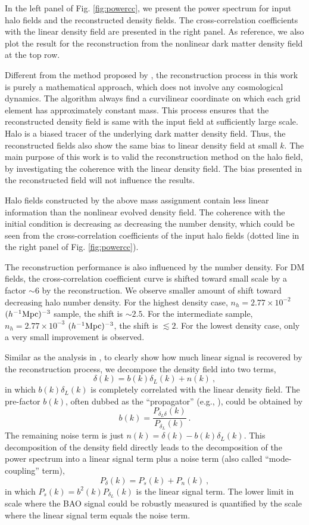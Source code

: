 \documentclass[iop]{emulateapj}
\newcommand{\be}{\begin{equation}}
\newcommand{\ee}{\end{equation}}
\newcommand{\mpch}{h^{-1} {\rm Mpc}}
\begin{document}
{In the left panel of Fig. \ref{fig:powercc}, we present the power spectrum for input halo fields and the reconstructed density fields.
The cross-correlation coefficients with the linear density field are presented in the right panel.
As reference, we also plot the result for the reconstruction from the nonlinear dark matter density field at the top row.

Different from the method proposed by \cite{Eisenstein07},
the reconstruction process in this work is purely a mathematical approach, 
which does not involve any cosmological dynamics.
The algorithm always find a curvilinear coordinate on which each grid element has approximately constant mass.
This process ensures that the reconstructed density field is same with the input field at sufficiently large scale.
Halo is a biased tracer of the underlying dark matter density field.
Thus, the reconstructed fields also show the same bias to linear density field at small $k$.
The main purpose of this work is to valid the reconstruction method on the halo field, by investigating the coherence with the linear density field.
The bias presented in the reconstructed field will not influence the results.

Halo fields constructed by the above mass assignment contain less linear information than the nonlinear evolved density field.
The coherence with the initial condition is decreasing as decreasing the number density,
which could be seen from the cross-correlation coefficients of the input halo fields (dotted line in the right panel of Fig. \ref{fig:powercc}).

The reconstruction performance is also influenced by the number density.
For DM fields, the cross-correlation coefficient curve is shifted toward small scale by a factor $\sim 6$ by the reconstruction.
We observe smaller amount of shift toward decreasing halo number density.
For the highest density case, $n_h=2.77\times 10^{-2}$ $(\mpch)^{-3}$ sample, the shift is $\sim 2.5$.
For the intermediate sample, $n_h=2.77\times 10^{-3}$ $(\mpch)^{-3}$, the shift is $\lesssim 2$.
For the lowest density case, only a very small improvement is observed.

Similar as the analysis in \cite{Seo16}, to clearly show how much linear signal is recovered by the reconstruction process,
we decompose the density field into two terms, 
\be
\delta(k)=b(k)\delta_L(k)+n(k)\ ,
\ee
in which $b(k)\delta_L(k)$ is completely correlated with the linear density field.
The pre-factor $b(k)$, often dubbed as the ``propagator'' (e.g., \cite{Crocce06,Crocce08,Matsubara08,Taruya09}), could be obtained by
\be
b(k)=\frac{P_{\delta_L\delta}(k)}{P_{\delta_L}(k)}\ .
\ee
The remaining noise term is just $n(k)=\delta(k)-b(k)\delta_L(k)$.
This decomposition of the density field directly leads to the decomposition of the power spectrum into a linear signal term plus a noise term (also called ``mode-coupling'' term),
\be
\label{eqn:powerdecom}
P_\delta(k)=P_s(k)+P_n(k)\ ,
\ee
in which $P_s(k)=b^2(k)P_{\delta_L}(k)$ is the linear signal term.
The lower limit in scale where the BAO signal could be robustly measured is quantified by the scale where the linear signal term equals the noise term.

}
\end{document}
